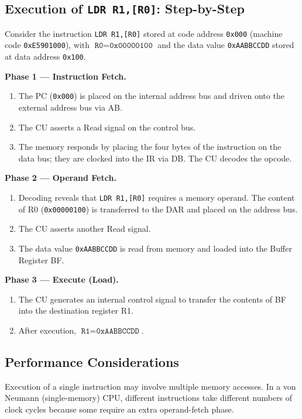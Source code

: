 \documentclass[11pt, a4paper, notitlepage]{report}
\theoremstyle{definition}
\theoremstyle{remark}
\theoremstyle{definition}
\begin{document}
\subsection{Execution of \texttt{LDR R1,[R0]}: Step-by-Step}

Consider the instruction \texttt{LDR R1,[R0]} stored at code address \texttt{0x000} (machine code \texttt{0xE5901000}), with $\texttt{R0} = \texttt{0x00000100}$ and the data value \texttt{0xAABBCCDD} stored at data address \texttt{0x100}.

\textbf{Phase 1 --- Instruction Fetch.}
\begin{enumerate}
  \item The PC (\texttt{0x000}) is placed on the internal address bus and driven onto the external address bus via AB\@.
  \item The CU asserts a Read signal on the control bus.
  \item The memory responds by placing the four bytes of the instruction on the data bus; they are clocked into the IR via DB\@. The CU decodes the opcode.
\end{enumerate}

\textbf{Phase 2 --- Operand Fetch.}
\begin{enumerate}[resume]
  \item Decoding reveals that \texttt{LDR R1,[R0]} requires a memory operand. The content of R0 (\texttt{0x00000100}) is transferred to the DAR and placed on the address bus.
  \item The CU asserts another Read signal.
  \item The data value \texttt{0xAABBCCDD} is read from memory and loaded into the Buffer Register BF\@.
\end{enumerate}

\textbf{Phase 3 --- Execute (Load).}
\begin{enumerate}[resume]
  \item The CU generates an internal control signal to transfer the contents of BF into the destination register R1.
  \item After execution, $\texttt{R1} = \texttt{0xAABBCCDD}$.
\end{enumerate}

\subsection{Performance Considerations}

Execution of a single instruction may involve multiple memory accesses. In a von Neumann (single-memory) CPU, different instructions take different numbers of clock cycles because some require an extra operand-fetch phase.
\end{document}
